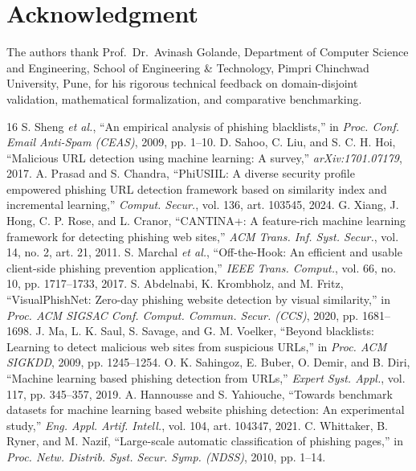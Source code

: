 \documentclass[conference]{IEEEtran}
\begin{document}
\section*{Acknowledgment}
The authors thank Prof.\ Dr.\ Avinash Golande, Department of Computer Science and Engineering, School of Engineering \& Technology, Pimpri Chinchwad University, Pune, for his rigorous technical feedback on domain-disjoint validation, mathematical formalization, and comparative benchmarking.

\begin{thebibliography}{16}
 S. Sheng \textit{et al.}, ``An empirical analysis of phishing blacklists,'' in \textit{Proc. Conf. Email Anti-Spam (CEAS)}, 2009, pp. 1--10.
 D. Sahoo, C. Liu, and S. C. H. Hoi, ``Malicious URL detection using machine learning: A survey,'' \textit{arXiv:1701.07179}, 2017.
 A. Prasad and S. Chandra, ``PhiUSIIL: A diverse security profile empowered phishing URL detection framework based on similarity index and incremental learning,'' \textit{Comput. Secur.}, vol. 136, art. 103545, 2024.
 G. Xiang, J. Hong, C. P. Rose, and L. Cranor, ``CANTINA+: A feature-rich machine learning framework for detecting phishing web sites,'' \textit{ACM Trans. Inf. Syst. Secur.}, vol. 14, no. 2, art. 21, 2011.
 S. Marchal \textit{et al.}, ``Off-the-Hook: An efficient and usable client-side phishing prevention application,'' \textit{IEEE Trans. Comput.}, vol. 66, no. 10, pp. 1717--1733, 2017.
 S. Abdelnabi, K. Krombholz, and M. Fritz, ``VisualPhishNet: Zero-day phishing website detection by visual similarity,'' in \textit{Proc. ACM SIGSAC Conf. Comput. Commun. Secur. (CCS)}, 2020, pp. 1681--1698.
 J. Ma, L. K. Saul, S. Savage, and G. M. Voelker, ``Beyond blacklists: Learning to detect malicious web sites from suspicious URLs,'' in \textit{Proc. ACM SIGKDD}, 2009, pp. 1245--1254.
 O. K. Sahingoz, E. Buber, O. Demir, and B. Diri, ``Machine learning based phishing detection from URLs,'' \textit{Expert Syst. Appl.}, vol. 117, pp. 345--357, 2019.
 A. Hannousse and S. Yahiouche, ``Towards benchmark datasets for machine learning based website phishing detection: An experimental study,'' \textit{Eng. Appl. Artif. Intell.}, vol. 104, art. 104347, 2021.
 C. Whittaker, B. Ryner, and M. Nazif, ``Large-scale automatic classification of phishing pages,'' in \textit{Proc. Netw. Distrib. Syst. Secur. Symp. (NDSS)}, 2010, pp. 1--14.

\end{thebibliography}
\end{document}
